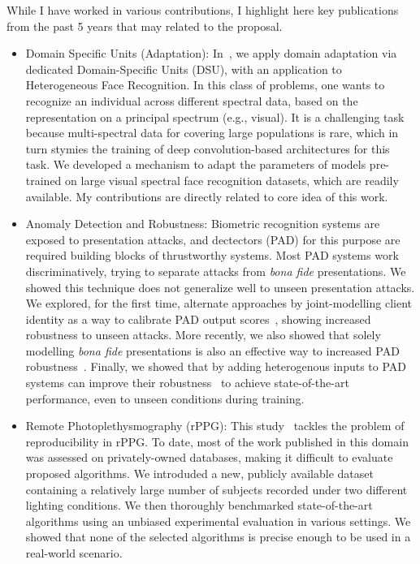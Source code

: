 \documentclass[11pt,a4paper,sans]{moderncv}
\begin{document}
While I have worked in various contributions, I highlight here key publications
from the past 5 years that may related to the proposal.

\begin{itemize}

    \item Domain Specific Units (Adaptation): In~\cite{tifs-2019}, we apply
        domain adaptation via dedicated Domain-Specific Units (DSU), with an
        application to Heterogeneous Face Recognition.  In this class of
        problems, one wants to recognize an individual across different
        spectral data,  based on the representation on a principal spectrum
        (e.g., visual).  It is a challenging task because multi-spectral data
        for covering large populations is rare, which in turn stymies the
        training of deep convolution-based architectures for this task.  We
        developed a mechanism to adapt the parameters of models pre-trained on
        large visual spectral face recognition datasets, which are readily
        available.  My contributions are directly related to core idea of this
        work.

  \item Anomaly Detection and Robustness: Biometric recognition systems are
      exposed to presentation attacks, and dectectors (PAD) for this purpose
      are required building blocks of thrustworthy systems.  Most PAD systems
      work discriminatively, trying to separate attacks from \textit{bona fide}
      presentations.  We showed this technique does not generalize well to
      unseen presentation attacks.  We explored, for the first time, alternate
      approaches by joint-modelling client identity as a way to calibrate PAD
      output scores~\cite{tifs-2015}, showing increased robustness to unseen
      attacks.  More recently, we also showed that solely modelling
      \textit{bona fide} presentations is also an effective way to increased
      PAD robustness~\cite{icb-2018}.  Finally, we showed that by adding
      heterogenous inputs to PAD systems can improve their
      robustness~\cite{tifs-2019-2} to achieve state-of-the-art performance,
      even to unseen conditions during training.

  \item Remote Photoplethysmography (rPPG):  This study~\cite{arxiv-2017-2}
      tackles the problem of reproducibility in rPPG. To date, most of the work
      published in this domain was assessed on privately-owned databases,
      making it difficult to evaluate proposed algorithms.   We introduded a
      new, publicly available dataset containing a relatively large number of
      subjects recorded under two different lighting conditions.  We then
      thoroughly benchmarked state-of-the-art algorithms using an unbiased
      experimental evaluation in various settings.  We showed that none of the
      selected algorithms is precise enough to be used in a real-world
      scenario.

\end{itemize}
\end{document}
